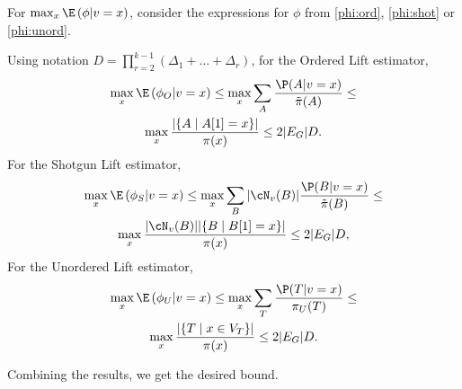 For $\max_x \E\left(\phi|v=x\right)$, consider the expressions for $\phi$ from \eqref{phi:ord}, \eqref{phi:shot} or \eqref{phi:unord}.

Using notation $D = \prod_{r=2}^{k-1} (\Delta_1 +\ldots + \Delta_r)$, for the Ordered Lift estimator,
\begin{multline*}
    \max_x \E\left(\phi_O|v=x\right) \le \max_x \sum_{A} \frac{\P(A|v=x)}{\tilde\pi(A)} \le \\
    \max_x \frac{|\{A\mid A[1]=x\}|}{\pi(x)} \le 2|E_G|D.
\end{multline*}
For the Shotgun Lift estimator,
\begin{multline*}
    \max_x \E\left(\phi_S|v=x\right) \le
    \max_x \sum_B |\cN_v(B)|\frac{\P(B|v=x)}{\tilde\pi(B)} \leq \\
    \max_x \frac{|\cN_v(B)| |\{B\mid B[1]=x\}|}{\pi(x)} \leq
    2|E_G| D,
\end{multline*}
For the Unordered Lift estimator,
\begin{multline*}
    \max_x \E\left(\phi_U|v=x\right) \le
    \max_x \sum_T \frac{\P(T|v=x)}{\pi_U(T)} \leq \\
    \max_x \frac{|\{T\mid x\in V_T\}|}{\pi(x)} \leq
    2|E_G| D.
\end{multline*}

Combining the results, we get the desired bound.
